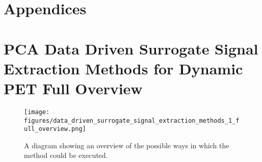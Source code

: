
\chapter{Appendices}
    \newpage
    \appendix
    
    \chapter{PCA Data Driven Surrogate Signal Extraction Methods for Dynamic PET Full Overview} \label{sec:pca_data_driven_surrogate_signal_extraction_methods_for_dynamic_pet_full_overview}
        \begin{figure}
            \centering
            
            \texttt{[image: figures/data\_driven\_surrogate\_signal\_extraction\_methods\_1\_full\_overview.png]}
            
            \captionsetup{singlelinecheck=false, justification=centering}
            \caption{A diagram showing an overview of the possible ways in which the method could be executed.}
            \label{fig:pca_data_driven_surrogate_signal_extraction_methods_for_dynamic_pet_appendix_full_overview}
        \end{figure}
